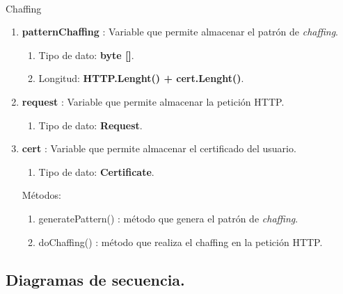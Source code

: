 \documentclass[12pt, a4paper, titlepage]{report}
\begin{document}
			    \paragraph{}
	            Chaffing
			    \begin{enumerate}
    		        \item \textbf{patternChaffing} : Variable que permite almacenar el patrón de \textit{chaffing}.
    		        \begin{enumerate}
    		            \item Tipo de dato: \textbf{byte []}.
    		            \item Longitud: \textbf{HTTP.Lenght() + cert.Lenght()}.
    		        \end{enumerate}
    		        \item \textbf{request} : Variable que permite almacenar la petición HTTP.
    		        \begin{enumerate}
    		            \item Tipo de dato: \textbf{Request}.
    		        \end{enumerate}
    		        \item \textbf{cert} : Variable que permite almacenar el certificado del usuario.
    		        \begin{enumerate}
    		            \item Tipo de dato: \textbf{Certificate}.
    		        \end{enumerate}
    		        
    		        Métodos:
    		        \begin{enumerate}
    		            \item generatePattern() : método que genera el patrón de \textit{chaffing}.
    		            \item doChaffing() : método que realiza el chaffing en la petición HTTP.
    		        \end{enumerate}
			    \end{enumerate}

            \subsection{Diagramas de secuencia.}       
          	
\end{document}
